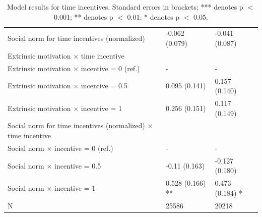 \documentclass[AER]{AEA}
\begin{document}
\begin{table}[hbt!]
\begin{tabular}{p{8cm}|l|p{3cm}}
Social norm for time incentives (normalized) & -0.062 (0.079) & -0.041 (0.087)\\
Extrinsic motivation $\times$ time incentive &  & \\
\hspace{0.7cm} Extrinsic motivation $\times$ incentive = 0 (ref.) & - & -\\
\hspace{0.7cm} Extrinsic motivation $\times$ incentive = 0.5 & 0.095 (0.141) & 0.157 (0.140)\\
\hspace{0.7cm} Extrinsic motivation $\times$ incentive = 1 & 0.256 (0.151) & 0.117 (0.149)\\
Social norm for time incentives (normalized) $\times$ time incentive &  & \\
\hspace{0.7cm} Social norm $\times$ incentive = 0 (ref.) & - & -\\
\hspace{0.7cm} Social norm $\times$ incentive = 0.5 & -0.11 (0.163) & -0.127 (0.180)\\
\hspace{0.7cm} Social norm $\times$ incentive = 1 & 0.528 (0.166) ** & 0.473 (0.184) *\\
N & 25586 & 20218
    \end{tabular}
    \caption{Model results for time incentives. Standard errors in brackets; *** denotes p $<$ 0.001; ** denotes p $<$ 0.01; * denotes p $<$ 0.05.}
    \label{tab:model_time}
\end{table}


    
\end{document}
